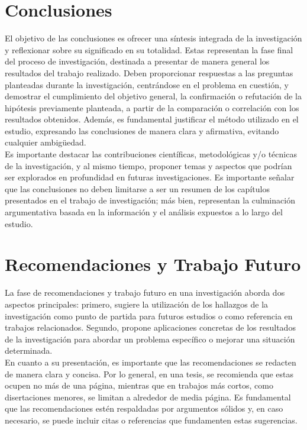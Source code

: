 \documentclass[12pt,a4paper,oneside]{report}
\begin{document}
\section{Conclusiones}

El objetivo de las conclusiones es ofrecer una síntesis integrada de la investigación y reflexionar sobre su significado en su totalidad. Estas representan la fase final del proceso de investigación, destinada a presentar de manera general los resultados del trabajo realizado. Deben proporcionar respuestas a las preguntas planteadas durante la investigación, centrándose en el problema en cuestión, y demostrar el cumplimiento del objetivo general, la confirmación o refutación de la hipótesis previamente planteada, a partir de la comparación o correlación con los resultados obtenidos. Además, es fundamental justificar el método utilizado en el estudio, expresando las conclusiones de manera clara y afirmativa, evitando cualquier ambigüedad.\\

Es importante destacar las contribuciones científicas, metodológicas y/o técnicas de la investigación, y al mismo tiempo, proponer temas y aspectos que podrían ser explorados en profundidad en futuras investigaciones. Es importante señalar que las conclusiones no deben limitarse a ser un resumen de los capítulos presentados en el trabajo de investigación; más bien, representan la culminación argumentativa basada en la información y el análisis expuestos a lo largo del estudio.


\section{Recomendaciones y Trabajo Futuro}

La fase de recomendaciones y trabajo futuro en una investigación aborda dos aspectos principales: primero, sugiere la utilización de los hallazgos de la investigación como punto de partida para futuros estudios o como referencia en trabajos relacionados. Segundo, propone aplicaciones concretas de los resultados de la investigación para abordar un problema específico o mejorar una situación determinada.\\

En cuanto a su presentación, es importante que las recomendaciones se redacten de manera clara y concisa. Por lo general, en una tesis, se recomienda que estas ocupen no más de una página, mientras que en trabajos más cortos, como disertaciones menores, se limitan a alrededor de media página. Es fundamental que las recomendaciones estén respaldadas por argumentos sólidos y, en caso necesario, se puede incluir citas o referencias que fundamenten estas sugerencias.\\
\end{document}
